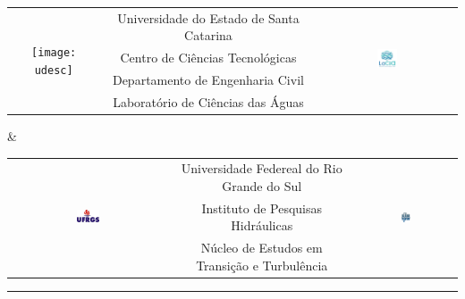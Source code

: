 \documentclass[12pt, a4paper]{article}
\begin{document}
\begin{titlepage}


\begin{table}[htp]
\centering
\begin{tabular}{ccc}
\multirow{4}{*}{\texttt{[image: udesc]}} & Universidade do Estado de Santa Catarina & \multirow{4}{*}{\includegraphics[width=0.15\textwidth]{lacia}} \\
                  & Centro de Ciências Tecnológicas &                   \\
                  & Departamento de Engenharia Civil &                   \\
                  &   Laboratório de Ciências das Águas &                  
\end{tabular}
\end{table}


\& \\[.5 cm]  


\begin{table}[htp]
\centering
\begin{tabular}{ccc}
\multirow{3}{*}{\includegraphics[width=0.15\textwidth]{ufrgs}} & Universidade Federeal do Rio Grande do Sul & \multirow{3}{*}{\includegraphics[width=0.10\textwidth]{iph}} \\
                  & Instituto de Pesquisas Hidráulicas &                   \\
                  & Núcleo de Estudos em Transição e Turbulência &                   \\               
\end{tabular}
\end{table}

\vspace{3cm}

\begin{flushleft}
	
\noindent\rule{\linewidth}{0.2 mm} \\[1 cm]
	

\end{flushleft}
\end{titlepage}
\end{document}
